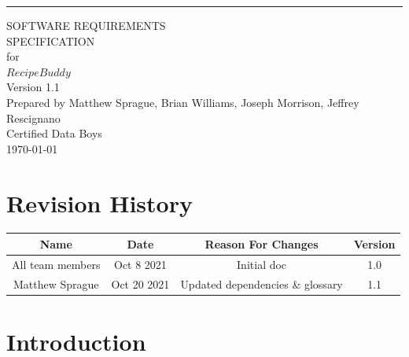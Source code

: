 \documentclass{scrreprt}
\def\myversion{1.1}
\begin{document}
\begin{flushright}
    \rule{16cm}{5pt}\vskip1cm
    \begin{bfseries}
        \Huge{SOFTWARE REQUIREMENTS\\ SPECIFICATION}\\
        \vspace{1.85cm}
        for\\
        \vspace{1.85cm}
        $Recipe Buddy$\\
        \vspace{1.8cm}
        \LARGE{Version \myversion}\\
        \vspace{1.8cm}
        Prepared by $ $Matthew Sprague, Brian Williams, Joseph Morrison, Jeffrey Rescignano$ $\\
        \vspace{1.8cm}
        $ $Certified Data Boys$ $\\
        \vspace{1.8cm}
        \today\\
    \end{bfseries}
\end{flushright}

\tableofcontents

\chapter*{Revision History}\label{revisions}

\begin{center}
    \begin{tabular}{c c c c}
        \midrule
        Name             & Date       & Reason For Changes & Version \\
        \midrule
        All team members & Oct 8 2021 & Initial doc        & 1.0     \\
        \midrule
        Matthew Sprague
                         & Oct 20 2021
                         & Updated dependencies \& glossary
                         & 1.1                                       \\
        \midrule
    \end{tabular}
\end{center}

\chapter{Introduction}
\end{document}

